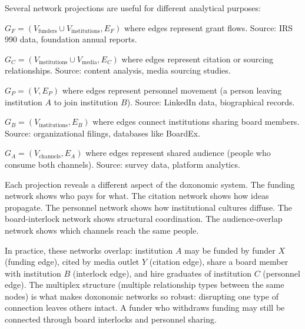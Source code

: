 \begin{definition}
\label{def:network-types}
Several network projections are useful for different analytical purposes:
\begin{description}[nosep]
  \item[Funding network:] $G_F = (V_{\text{funders}} \cup V_{\text{institutions}}, E_F)$ where edges represent grant flows.
  Source: IRS 990 data, foundation annual reports.
  \item[Citation network:] $G_C = (V_{\text{institutions}} \cup V_{\text{media}}, E_C)$ where edges represent citation or sourcing relationships.
  Source: content analysis, media sourcing studies.
  \item[Personnel network:] $G_P = (V, E_P)$ where edges represent personnel movement (a person leaving institution $A$ to join institution $B$).
  Source: LinkedIn data, biographical records.
  \item[Board interlock:] $G_B = (V_{\text{institutions}}, E_B)$ where edges connect institutions sharing board members.
  Source: organizational filings, databases like BoardEx.
  \item[Audience overlap:] $G_A = (V_{\text{channels}}, E_A)$ where edges represent shared audience (people who consume both channels).
  Source: survey data, platform analytics.
\end{description}
\end{definition}

Each projection reveals a different aspect of the doxonomic system.
The funding network shows who pays for what.
The citation network shows how ideas propagate.
The personnel network shows how institutional cultures diffuse.
The board-interlock network shows structural coordination.
The audience-overlap network shows which channels reach the same people.

\begin{remark}
\label{rem:multiplex}
In practice, these networks overlap: institution $A$ may be funded by funder $X$ (funding edge), cited by media outlet $Y$ (citation edge), share a board member with institution $B$ (interlock edge), and hire graduates of institution $C$ (personnel edge).
The multiplex structure (multiple relationship types between the same nodes) is what makes doxonomic networks so robust: disrupting one type of connection leaves others intact.
A funder who withdraws funding may still be connected through board interlocks and personnel sharing.
\end{remark}


